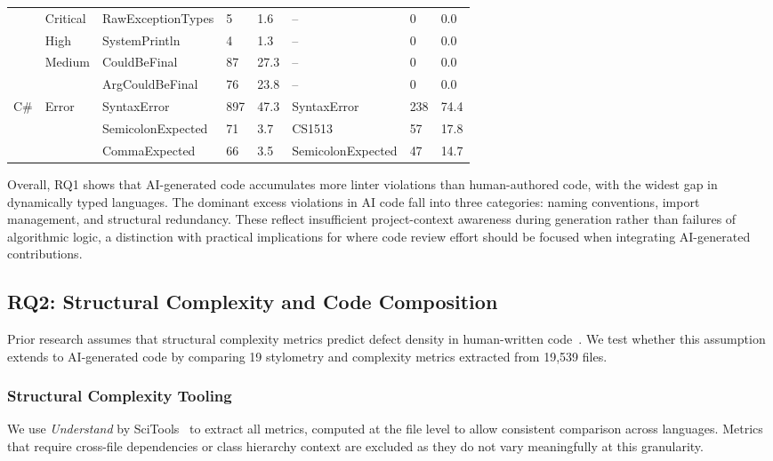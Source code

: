 \begin{table}[t!]
\begin{tabularx}{\textwidth}{@{}lllXXlXX@{}}
& Critical
  & RawExceptionTypes & 5 & 1.6 & -- & 0 & 0.0 \\
& High
  & SystemPrintln & 4 & 1.3 & -- & 0 & 0.0 \\
& \multirow{2}{*}{Medium}
  & CouldBeFinal & 87 & 27.3 & -- & 0 & 0.0 \\
& & ArgCouldBeFinal & 76 & 23.8 & -- & 0 & 0.0 \\
\midrule
\multirow{3}{*}{C\#}
& \multirow{3}{*}{Error}
  & SyntaxError & 897 & 47.3 & SyntaxError & 238 & 74.4 \\
& & SemicolonExpected & 71 & 3.7 & CS1513 & 57 & 17.8 \\
& & CommaExpected & 66 & 3.5 & SemicolonExpected & 47 & 14.7 \\
\bottomrule
\end{tabularx}
\end{table}

Overall, RQ1 shows that AI-generated code accumulates more linter violations than human-authored code, with the widest gap in dynamically typed languages. The dominant excess violations in AI code fall into three categories: naming conventions, import management, and structural redundancy. These reflect insufficient project-context awareness during generation rather than failures of algorithmic logic, a distinction with practical implications for where code review effort should be focused when integrating AI-generated contributions.

\subsection{RQ2: Structural Complexity and Code Composition}
\label{sec:results-rq2}

Prior research assumes that structural complexity metrics predict defect density in human-written code~\cite{curtis1979measuring, sneed1995understanding, zuse1993criteria}. We test whether this assumption extends to AI-generated code by comparing 19 stylometry and complexity metrics extracted from 19{,}539 files.

\subsubsection{Structural Complexity Tooling}
We use \emph{Understand} by SciTools~\cite{SciToolsUnderstand} to extract all metrics, computed at the file level to allow consistent comparison across languages. Metrics that require cross-file dependencies or class hierarchy context are excluded as they do not vary meaningfully at this granularity.


